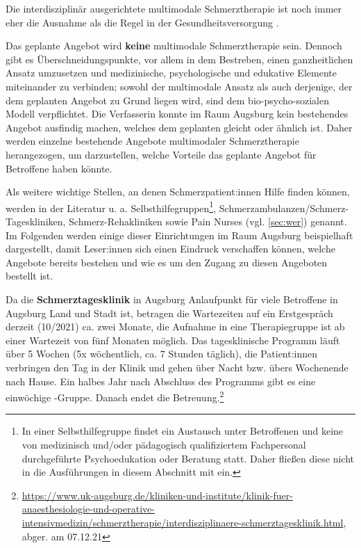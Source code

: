 \documentclass[
  twoside,
  parskip=half-,
]{scrreprt}
\begin{document}
Die interdisziplinär ausgerichtete multimodale Schmerztherapie ist noch immer eher die Ausnahme als die Regel in der Gesundheitsversorgung \autocite[99]{nobisHerausforderung}. 
\begin{praxis}
  Das geplante Angebot wird \textbf{keine} multimodale Schmerztherapie sein. Dennoch gibt es Überschneidungspunkte, vor allem in dem Bestreben, einen ganzheitlichen Ansatz umzusetzen und medizinische, psychologische und edukative Elemente miteinander zu verbinden; sowohl der multimodale Ansatz als auch derjenige, der dem geplanten Angebot zu Grund liegen wird, sind dem bio-psycho-sozialen Modell verpflichtet. Die Verfasserin konnte im Raum Augsburg kein bestehendes Angebot ausfindig machen, welches dem geplanten gleicht oder ähnlich ist. Daher werden einzelne bestehende Angebote multimodaler Schmerztherapie herangezogen, um darzustellen, welche Vorteile das geplante Angebot für Betroffene haben könnte.
\end{praxis}

Als weitere wichtige Stellen, an denen Schmerzpatient:innen Hilfe finden können, werden in der Literatur \autocite[vgl.][Kap. 7]{nobisHerausforderung} u. a. Selbsthilfegruppen\footnote{In einer Selbsthilfegruppe findet ein Austausch unter Betroffenen und keine von medizinisch und/oder pädagogisch qualifiziertem Fachpersonal durchgeführte Psychoedukation oder Beratung statt. Daher fließen diese nicht in die Ausführungen in diesem Abschnitt mit ein.}, Schmerzambulanzen/Schmerz-Tageskliniken, Schmerz-Rehakliniken sowie Pain Nurses (vgl. \autoref{sec:wer}) genannt. Im Folgenden werden einige dieser Einrichtungen im Raum Augsburg beispielhaft dargestellt, damit Leser:innen sich einen Eindruck verschaffen können, welche Angebote bereits bestehen und wie es um den Zugang zu diesen Angeboten bestellt ist.

Da die \textbf{Schmerztagesklinik} in Augsburg Anlaufpunkt für viele Betroffene in Augsburg Land und Stadt ist, betragen die Wartezeiten auf ein Erstgespräch derzeit (10/2021) ca. zwei Monate, die Aufnahme in eine Therapiegruppe ist ab einer Wartezeit von fünf Monaten möglich. Das tagesklinische Programm läuft über 5 Wochen (5x wöchentlich, ca. 7 Stunden täglich), die Patient:innen verbringen den Tag in der Klinik und gehen über Nacht bzw. übers Wochenende nach Hause. Ein halbes Jahr nach Abschluss des Programms gibt es eine einwöchige -Gruppe. Danach endet die Betreuung.\footnote{\url{https://www.uk-augsburg.de/kliniken-und-institute/klinik-fuer-anaesthesiologie-und-operative-intensivmedizin/schmerztherapie/interdisziplinaere-schmerztagesklinik.html}, abger. am 07.12.21}
\end{document}
